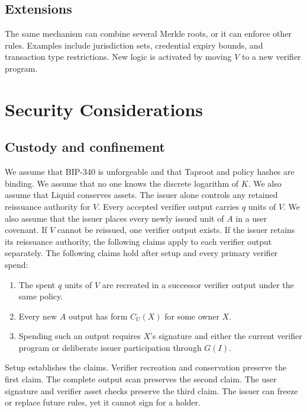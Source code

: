 \documentclass[11pt]{article}
\begin{document}
    \subsection{Extensions}

    The same mechanism can combine several Merkle roots, or it can enforce other rules.
    Examples include jurisdiction sets, credential expiry bounds, and transaction type restrictions.
    New logic is activated by moving $V$ to a new verifier program.


    \section{Security Considerations}
    \label{sec:security}

    \subsection{Custody and confinement}

    We assume that BIP-340 is unforgeable and that Taproot and policy hashes are binding.
    We assume that no one knows the discrete logarithm of $K$.
    We also assume that Liquid conserves assets.
    The issuer alone controls any retained reissuance authority for $V$.
    Every accepted verifier output carries $q$ units of $V$.
    We also assume that the issuer places every newly issued unit of $A$ in a user covenant.
    If $V$ cannot be reissued, one verifier output exists.
    If the issuer retains its reissuance authority, the following claims apply to each verifier output separately.
    The following claims hold after setup and every primary verifier spend:

    \begin{enumerate}
        \item The spent $q$ units of $V$ are recreated in a successor verifier output under the same policy.
        \item Every new $A$ output has form $C_U(X)$ for some owner $X$.
        \item Spending such an output requires $X$'s signature and either the current verifier program or deliberate issuer participation through $G(I)$.
    \end{enumerate}

    Setup establishes the claims.
    Verifier recreation and conservation preserve the first claim.
    The complete output scan preserves the second claim.
    The user signature and verifier asset checks preserve the third claim.
    The issuer can freeze or replace future rules, yet it cannot sign for a holder.
\end{document}
